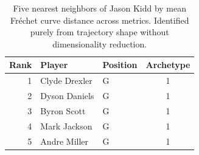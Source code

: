 \begin{table}[htbp]
  \centering\small
  \begin{tabular}{rllc}
    \toprule
    Rank & Player & Position & Archetype \\
    \midrule
    1 & Clyde Drexler & G & 1 \\
    2 & Dyson Daniels & G & 1 \\
    3 & Byron Scott & G & 1 \\
    4 & Mark Jackson & G & 1 \\
    5 & Andre Miller & G & 1 \\
    \bottomrule
  \end{tabular}
  \caption{Five nearest neighbors of Jason Kidd by mean Fr\'{e}chet curve distance across metrics. Identified purely from trajectory shape without dimensionality reduction.}
  \label{tab:Jason_Kidd_frechet_curve_neighbors}
\end{table}

